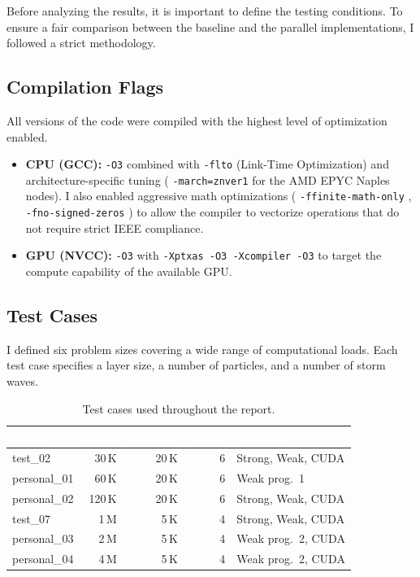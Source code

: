 \documentclass[10pt,dvipsnames,table,twocolumn]{article}
\let\oldtexttt\texttt
\renewcommand{\texttt}[1]{%
  {\small\colorbox{Mist}{\oldtexttt{\textcolor{DarkInk}{#1}}}}%
}
\begin{document}
Before analyzing the results, it is important to define the testing conditions. To ensure a fair comparison between the baseline and the parallel implementations, I followed a strict methodology.

\subsection{Compilation Flags}

All versions of the code were compiled with the highest level of optimization enabled.

\begin{itemize}
  \item \textbf{CPU (GCC):} \texttt{-O3} combined with \texttt{-flto} (Link-Time Optimization) and architecture-specific tuning (\texttt{-march=znver1} for the AMD EPYC Naples nodes). I also enabled aggressive math optimizations (\texttt{-ffinite-math-only}, \texttt{-fno-signed-zeros}) to allow the compiler to vectorize operations that do not require strict IEEE compliance.
  \item \textbf{GPU (NVCC):} \texttt{-O3} with \texttt{-Xptxas~-O3~-Xcompiler~-O3} to target the compute capability of the available GPU.
\end{itemize}

\subsection{Test Cases}

I defined six problem sizes covering a wide range of computational loads. Each test case specifies a layer size, a number of particles, and a number of storm waves.

\begin{table}[t]
\centering
\caption{Test cases used throughout the report.}\label{tbl:testcases}
\small
\begin{tabular}{@{}lrrrl@{}}
\rowcolor{TableHead}
\textcolor{white}{\textbf{Name}} &
\textcolor{white}{\textbf{Layer}} &
\textcolor{white}{\textbf{Particles}} &
\textcolor{white}{\textbf{Waves}} &
\textcolor{white}{\textbf{Used for}} \\
\midrule
test\_02          & 30\,K   & 20\,K & 6 & Strong, Weak, CUDA \\
\rowcolor{TableRowAlt}
personal\_01      & 60\,K   & 20\,K & 6 & Weak prog.\ 1 \\
personal\_02      & 120\,K  & 20\,K & 6 & Strong, Weak, CUDA \\
\rowcolor{TableRowAlt}
test\_07          & 1\,M    & 5\,K  & 4 & Strong, Weak, CUDA \\
personal\_03      & 2\,M    & 5\,K  & 4 & Weak prog.\ 2, CUDA \\
\rowcolor{TableRowAlt}
personal\_04      & 4\,M    & 5\,K  & 4 & Weak prog.\ 2, CUDA \\
\bottomrule
\end{tabular}
\end{table}
\end{document}
